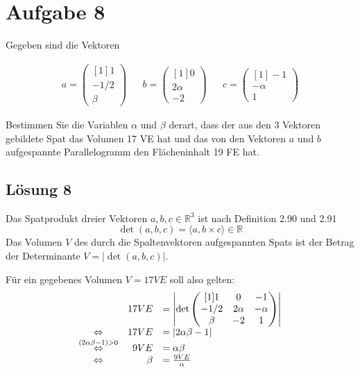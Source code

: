 \documentclass[main.tex]{subfiles}
\begin{document}
\section{Aufgabe 8}
Gegeben sind die Vektoren

\begin{align*}
    a=\begin{pmatrix}[1]
    1\\
    -1/2\\
    \beta
    \end{pmatrix} & & b=\begin{pmatrix}[1]
    0\\
    2\alpha \\
    -2
    \end{pmatrix} & & c=\begin{pmatrix}[1]
    -1\\
    -\alpha \\
    1
    \end{pmatrix}
\end{align*}

Bestimmen Sie die Variablen $\alpha$ und $\beta$ derart, dass der aus den 3 Vektoren gebildete Spat das Volumen 17 VE hat und das von den Vektoren $a$ und $b$ aufgespannte Parallelogramm den Flächeninhalt 19 FE hat.

\subsection{Lösung 8}


Das Spatprodukt dreier Vektoren $a,b,c\in \mathbb{R}^{3}$ ist nach Definition 2.90 und 2.91
\begin{equation*}
    \det( a,b,c) =\langle a,b\times c\rangle \in \mathbb{R}
\end{equation*}
Das Volumen $V$ des durch die Spaltenvektoren aufgespannten Spats ist der Betrag der Determinante $V=| \det( a,b,c)| $.

Für ein gegebenes Volumen $V=17VE$ soll also gelten:
\begin{equation*}
    \begin{array}{ c r l }
    & 17VE & =\left| \det\begin{pmatrix}[1]
    1 & 0 & -1\\
    -1/2 & 2\alpha  & -\alpha \\
    \beta  & -2 & 1
    \end{pmatrix}\right| \\
    \Leftrightarrow  & 17VE & =| 2\alpha \beta -1| \\
    \overset{( 2\alpha \beta -1)  >0}{\Leftrightarrow } & 9VE & =\alpha \beta \\
    \Leftrightarrow  & \beta  & =\frac{9VE}{\alpha }
    \end{array}
\end{equation*}
\end{document}
